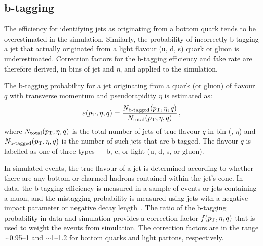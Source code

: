 \subsection{b-tagging}
\label{sec:analysis-mccorrections-btagging}

The efficiency for identifying jets as originating from a bottom quark tends to 
be overestimated in the simulation. Similarly, the probability of incorrectly 
b-tagging a jet that actually originated from a light flavour (u, d, s) quark 
or gluon is underestimated. Correction factors for the b-tagging efficiency and 
fake rate are therefore derived, in bins of jet \pt and $\eta$, and applied to 
the simulation.

The b-tagging probability 
for a jet originating from a quark (or gluon) of flavour $q$ with transverse 
momentum \pt and pseudorapidity $\eta$ is estimated as:
\begin{equation}
\label{eqn:btag-eff}
\varepsilon({p_{\text T}}, \eta, q) = \frac{N_{\text{b-tagged}}({p_{\text T}}, \eta, 
q)}{N_{\text{total}}({p_{\text T}}, \eta, q)} \, ,
\end{equation}
where $N_{\text{total}}({p_{\text T}}, \eta, q)$ is the total number of jets of true 
flavour $q$ in bin (\pt, $\eta$) and $N_{\text{b-tagged}}({p_{\text T}}, \eta, q)$ is 
the number of such jets that are b-tagged.
The flavour $q$ is labelled as one of three types --- b, c, or light (u, d, 
s, or gluon).

In simulated events, the true flavour of a jet is determined according to 
whether there are any bottom or charmed hadrons contained within the jet's cone.
In data, the b-tagging efficiency is measured in a sample of \ttbar events or 
jets containing a muon, and the mistagging probability is measured using jets 
with a negative impact parameter or negative decay 
length~\cite{btagging-cms-run2}.
The ratio of the b-tagging probability in data and simulation provides a 
correction factor $f({p_{\text T}}, \eta, q)$ that is used to weight the events from 
simulation.
The correction factors are in the range $\sim$0.95–1 and $\sim$1–1.2 for bottom 
quarks and light partons, respectively.

